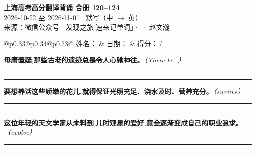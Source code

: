 \documentclass[11pt,a4paper]{article}
\newcommand{\num}[1]{\makebox[1.9em][r]{#1.}\hspace{0.3em}}
\newcommand{\wline}{\noindent\rule{\linewidth}{0.4pt}}
\newcommand{\prompt}[1]{\emph{\textcolor{tipblue}{\small（#1）}}}
\begin{document}
\pagestyle{plain}
\begin{center}
{\LARGE\bfseries 上海高考高分翻译背诵 \quad 合册 120–124}\\[0.25em]
{\large 2026-10-22 至 2026-11-01 \quad\ 默写（中 $\to$ 英）}\\[0.35em]
{\footnotesize 来源：微信公众号「发现之旅 速来记单词」·  · 赵文瀚}
\end{center}

\vspace{0.4em}
\noindent\begin{tabular}{@{}p{0.33\textwidth}@{}p{0.34\textwidth}@{}p{0.33\textwidth}@{}}
姓名：\underline{\hspace{2.0cm}} & 日期：\underline{\hspace{2.0cm}} & 得分：\underline{\hspace{1.4cm}}\,/ \\
\end{tabular}

\vspace{0.5em}

\vspace{0.8em}
\vspace{0.35em}\vspace{0.15em}

\begin{minipage}{\linewidth}

\num{1}\textbf{毋庸置疑,那些古老的遗迹总是令人心驰神往。}\prompt{There be…}

\vspace{0.3em}

\wline\vspace{0.3em}
\wline

\end{minipage}

\begin{minipage}{\linewidth}

\num{2}\textbf{要想养活这些娇嫩的花儿,就得保证光照充足、浇水及时、营养充分。}\prompt{survive}

\vspace{0.3em}

\wline\vspace{0.3em}
\wline

\end{minipage}

\begin{minipage}{\linewidth}

\num{3}\textbf{这位年轻的天文学家从未料到,儿时观星的爱好,竟会逐渐变成自己的职业追求。}\prompt{evolve}

\vspace{0.3em}

\wline\vspace{0.3em}
\wline

\end{minipage}
\end{document}
